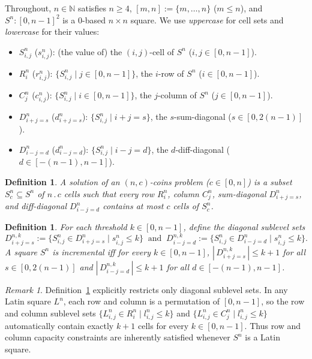\documentclass[10pt,a4paper]{article}
\newtheorem{definition}[theorem]{Definition}
\theoremstyle{remark}
\newtheorem{remark}[theorem]{Remark}
\begin{document}
Throughout, $n \in \mathbb{N}$ satisfies $n \ge 4$, $[m,n] := \{m, \dots, n\}$ ($m \le n$), and
$S^n : [0,n-1]^2$ is a $0$-based $n \!\times\! n$ square. We use \emph{uppercase} for cell sets and
\emph{lowercase} for their values:
\begin{itemize}[nosep]
\item $S^n_{i,j}$ ($s^n_{i,j}$): (the value of) the $(i,j)$-cell of $S^n$ ($i,j \in [0,n-1]$).
\item $R^n_i$ ($r^n_{i,j}$): $\{S^n_{i,j} \mid j \in [0,n-1]\}$, the $i$-row of $S^n$ ($i \in [0,n-1]$).
\item $C^n_j$ ($c^n_{i,j}$): $\{S^n_{i,j} \mid i \in [0,n-1]\}$, the $j$-column of $S^n$ ($j \in [0,n-1]$).
\item $D^n_{i+j=s}$ ($d^n_{i+j=s}$): $\{S^n_{i,j} \mid i + j = s\}$, the $s$-sum-diagonal ($s \in [0,2(n-1)]$).
\item $D^n_{i-j=d}$ ($d^n_{i-j=d}$): $\{S^n_{i,j} \mid i - j = d\}$, the $d$-diff-diagonal ($d \in [-(n-1),n-1]$).
\end{itemize}

\begin{definition}\label{def:nc}
A solution of an $(n,c)$-coins problem ($c \in [0,n]$) is a subset $S^n_c \subseteq S^n$ of $n\,.\,c$
cells such that every row $R^n_i$, column $C^n_j$, sum-diagonal $D^n_{i+j=s}$, and diff-diagonal
$D^n_{i-j=d}$ contains at most $c$ cells of $S^n_c$.
\end{definition}

\begin{definition}\label{def:is}
For each threshold $k \in [0,n-1]$, define the diagonal sublevel sets
\[
    D^{n,k}_{i+j=s} := \{S^n_{i,j} \in D^n_{i+j=s} \mid s^n_{i,j} \le k\}
    \;\;\text{and}\;\;
    D^{n,k}_{i-j=d} := \{S^n_{i,j} \in D^n_{i-j=d} \mid s^n_{i,j} \le k\}.
\]
A square $S^n$ is \emph{incremental} iff for every $k \in [0,n-1]$,
$|\,D^{n,k}_{i+j=s}\,| \le k + 1$ for all $s \in [0,2(n-1)]$ and $|\,D^{n,k}_{i-j=d}\,| \le k + 1$
for all $d \in [-(n-1),n-1]$.
\end{definition}

\begin{remark}\label{rem:row-col}
Definition~\ref{def:is} explicitly restricts only diagonal sublevel sets. In any Latin square $L^n$, each row and column is a permutation of $[0,n-1]$, so the row and column sublevel sets $\{L^n_{i,j} \in R^n_i \mid l^n_{i,j} \le k\}$ and $\{L^n_{i,j} \in C^n_j \mid l^n_{i,j} \le k\}$ automatically contain exactly $k + 1$ cells for every $k \in [0,n-1]$. Thus row and column capacity constraints are inherently satisfied whenever $S^n$ is a Latin square.
\end{remark}
\end{document}
